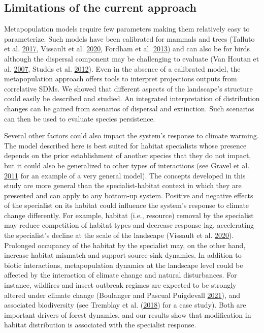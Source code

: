 \documentclass[12pt]{article}
\begin{document}
\hypertarget{limitations-of-the-current-approach}{%
\subsection{Limitations of the current
approach}\label{limitations-of-the-current-approach}}

Metapopulation models require few parameters making them relatively easy
to parameterize. Such models have been calibrated for mammals and trees
(Talluto et al. \protect\hyperlink{ref-talluto_extinction_2017}{2017},
Vissault et al. \protect\hyperlink{ref-vissault_slow_2020}{2020},
Fordham et al. \protect\hyperlink{ref-fordham_adapted_2013}{2013}) and
can also be for birds although the dispersal component may be
challenging to evaluate (Van Houtan et al.
\protect\hyperlink{ref-van_houtan_dispersal_2007}{2007}, Studds et al.
\protect\hyperlink{ref-studds_stable-hydrogen_2012}{2012}). Even in the
absence of a calibrated model, the metapopulation approach offers tools
to interpret projections outputs from correlative SDMs. We showed that
different aspects of the landscape's structure could easily be described
and studied. An integrated interpretation of distribution changes can be
gained from scenarios of dispersal and extinction. Such scenarios can
then be used to evaluate species persistence.

Several other factors could also impact the system's response to climate
warming. The model described here is best suited for habitat specialists
whose presence depends on the prior establishment of another species
that they do not impact, but it could also be generalized to other types
of interactions (see Gravel et al.
\protect\hyperlink{ref-gravel_trophic_2011}{2011} for an example of a
very general model). The concepts developed in this study are more
general than the specialist-habitat context in which they are presented
and can apply to any bottom-up system. Positive and negative effects of
the specialist on its habitat could influence the system's response to
climate change differently. For example, habitat (i.e., resource)
removal by the specialist may reduce competition of habitat types and
decrease response lag, accelerating the specialist's decline at the
scale of the landscape (Vissault et al.
\protect\hyperlink{ref-vissault_slow_2020}{2020}). Prolonged occupancy
of the habitat by the specialist may, on the other hand, increase
habitat mismatch and support source-sink dynamics. In addition to biotic
interactions, metapopulation dynamics at the landscape level could be
affected by the interaction of climate change and natural disturbances.
For instance, wildfires and insect outbreak regimes are expected to be
strongly altered under climate change (Boulanger and Pascual Puigdevall
\protect\hyperlink{ref-boulanger_boreal_2021}{2021}), and associated
biodiversity (see Tremblay et al.
(\protect\hyperlink{ref-tremblay_harvesting_2018}{2018}) for a case
study). Both are important drivers of forest dynamics, and our results
show that modification in habitat distribution is associated with the
specialist response.
\end{document}
